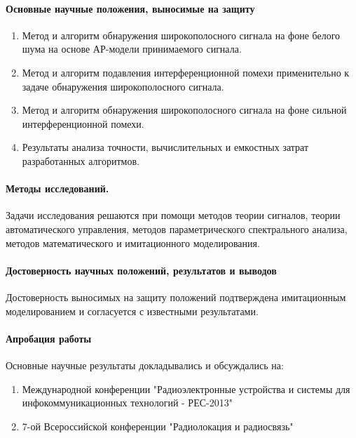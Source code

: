 \paragraph{Основные научные положения, выносимые на защиту}
\begin{enumerate}
	\item {Метод и алгоритм обнаружения широкополосного сигнала на фоне белого шума на основе АР-модели принимаемого сигнала.}
	\item {Метод и алгоритм подавления интерференционной помехи применительно к задаче обнаружения широкополосного сигнала.}
	\item {Метод и алгоритм обнаружения широкополосного сигнала на фоне сильной интерференционной помехи.}
	\item {Результаты анализа точности, вычислительных и емкостных затрат разработанных алгоритмов.}
\end{enumerate}

\paragraph{Методы исследований.} Задачи исследования решаются при помощи методов теории сигналов, теории автоматического управления,
методов параметрического спектрального анализа, методов математического и имитационного моделирования.

\paragraph{Достоверность научных положений, результатов и выводов}
Достоверность выносимых на защиту положений подтверждена имитационным моделированием и согласуется с известными результатами.

\paragraph{Апробация работы}
Основные научные результаты докладывались и обсуждались на:
\begin{enumerate}
	\item Международной конференции "Радиоэлектронные устройства и системы для инфокоммуникационных технологий - РЕС-2013"
	\item 7-ой Всероссийской конференции "Радиолокация и радиосвязь"
\end{enumerate}


